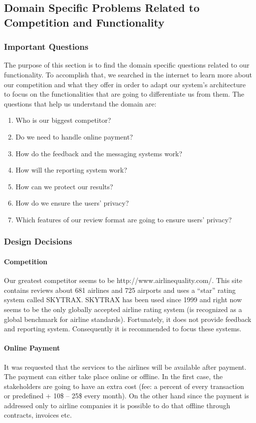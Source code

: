 \documentclass{article}
\begin{document}
\subsection{Domain Specific Problems Related to Competition and Functionality}
\subsubsection{Important Questions}
The purpose of this section is to find the domain specific questions related to our functionality. To accomplish that, we searched in the internet to learn more about our competition
and what they offer in order to adapt our system's architecture to focus on the functionalities that are going to differentiate us from them. The questions that help us understand the 
domain are:
\begin{enumerate}
\item Who is our biggest competitor?
\item Do we need to handle online payment?
\item How do the feedback and the messaging systems work?
\item How will the reporting system work?
\item How can we protect our results?
\item How do we ensure the users' privacy?
\item Which features of our review format are going to ensure users' privacy?
\end{enumerate}

\subsubsection{Design Decisions}
\paragraph{Competition} Our greatest competitor seems to be http://www.airlinequality.com/. This site contains reviews about 681 airlines and 725 airports and uses a “star” rating 
system called SKYTRAX. SKYTRAX has been used since 1999 and right now seems to be the only globally accepted airline rating system (is recognized as a global benchmark for airline 
standards). Fortunately, it does not provide feedback and reporting system. Consequently it is recommended to focus these systems.

\paragraph{Online Payment} It was requested that the services to the airlines will be available after payment. The payment can either take place online or offline. In the first case, 
the stakeholders are going to have an extra cost (fee: a percent of every transaction or predefined + 10\$ – 25\$ every month). On the other hand since the 
payment is addressed only to airline companies it is possible to do that offline through contracts, invoices etc.
\end{document}
